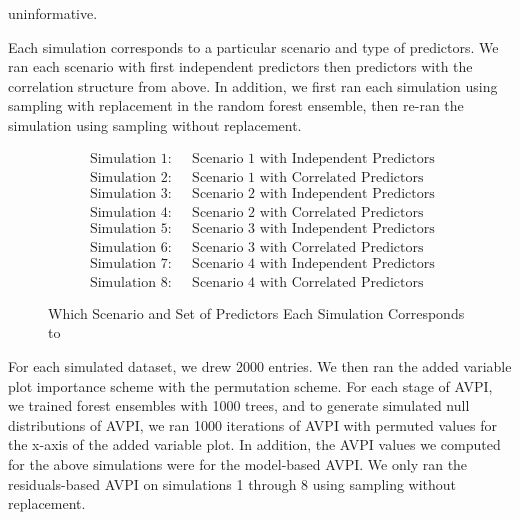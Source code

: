\documentclass[12pt,twoside]{reedthesis}
\theoremstyle{definition}
\theoremstyle{definition}
\theoremstyle{definition}
\theoremstyle{remark}
\begin{document}
uninformative. \par
\begin{table}

\caption{\label{tab:unnamed-chunk-10}Informative and Uninformative Variables For Each Scenario}
\centering
{}
\end{table}
Each simulation corresponds to a particular scenario and type of
predictors. We ran each scenario with first independent predictors then
predictors with the correlation structure from above. In addition, we
first ran each simulation using sampling with replacement in the random
forest ensemble, then re-ran the simulation using sampling without
replacement. \par
\begin{figure}[h]
\begin{align}
\text{ Simulation 1: } & \text{ Scenario 1 with Independent Predictors} \nonumber \\
\text{ Simulation 2: } & \text{ Scenario 1 with Correlated Predictors} \nonumber \\
\text{ Simulation 3: } & \text{ Scenario 2 with Independent Predictors} \nonumber \\
\text{ Simulation 4: } & \text{ Scenario 2 with Correlated Predictors} \nonumber \\
\text{ Simulation 5: } & \text{ Scenario 3 with Independent Predictors} \nonumber \\
\text{ Simulation 6: } & \text{ Scenario 3 with Correlated Predictors} \nonumber \\
\text{ Simulation 7: } & \text{ Scenario 4 with Independent Predictors} \nonumber \\
\text{ Simulation 8: } & \text{ Scenario 4 with Correlated Predictors} \nonumber
\end{align}
\caption{Which Scenario and Set of Predictors Each Simulation Corresponds to}
\label{ScenarioPredictors}
\end{figure}
For each simulated dataset, we drew 2000 entries. We then ran the added
variable plot importance scheme with the permutation scheme. For each
stage of AVPI, we trained forest ensembles with 1000 trees, and to
generate simulated null distributions of AVPI, we ran 1000 iterations of
AVPI with permuted values for the x-axis of the added variable plot. In
addition, the AVPI values we computed for the above simulations were for
the model-based AVPI. We only ran the residuals-based AVPI on
simulations 1 through 8 using sampling without replacement. \par
\end{document}
